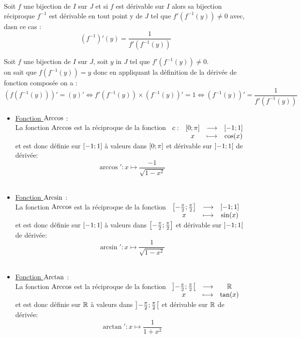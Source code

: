 \begin{defprop}
	Soit \(f\) une bijection de \(I\) sur \(J\)  et si \(f\) est dérivable sur \(I\) alors sa bijection réciproque \(f^{-1}\) est dérivable en tout point y de \(J\) tel que \(f'(f^{-1}(y)) \neq 0\) avec, dasn ce cas : \[(f^{-1})'(y) = \frac{1}{f'(f^{-1}(y))}\]
\end{defprop}
\begin{dem}
	Soit \(f\) une bijection de \(I\) sur \(J\), soit \(y\) in \(J\) tel que \(f'(f^{-1}(y)) \neq 0\). \\
	on sait que \(f(f^{-1}(y)) = y\) donc en appliquant la définition de la dérivée de fonction composée on a :
	\[(f(f^{-1}(y)))' = (y)' \iff f'(f^{-1}(y))\times (f^{-1}(y))' = 1 \iff (f^{-1}(y))' = \frac{1}{f'(f^{-1}(y))}\]
\end{dem}
\begin{defprop}
	\begin{itemize}
		\item \underline{Fonction \(\operatorname{Arccos}\)} : \\
		      La fonction \(\operatorname{Arccos}\) est la réciproque de la fonction \(\begin{array}[t]{cccc}c : & \left[0;\pi\right] & \longrightarrow & \left[-1;1\right] \\ & x & \longmapsto & \cos(x)\end{array}\) et est donc définie sur \(\left[-1;1\right]\) à valeurs dans \(\left[0;\pi\right]\) et dérivable sur \(\left]-1;1\right[\) de dérivée: \[\arccos':x\mapsto \frac{-1}{\sqrt{1-x^2}}\]\\
		\item \underline{Fonction \(\operatorname{Arcsin}\)} : \\
		      La fonction \(\operatorname{Arccos}\) est la réciproque de la fonction \(\begin{array}[t]{ccc}\left[-\frac{\pi}{2};\frac{\pi}{2}\right] & \longrightarrow & \left[-1;1\right] \\ x & \longmapsto & \sin(x)\end{array}\) et est donc définie sur \(\left[-1;1\right]\) à valeurs dans \(\left[-\frac{\pi}{2};\frac{\pi}{2}\right]\) et dérivable sur \(\left]-1;1\right[\) de dérivée: \[\arcsin':x\mapsto \frac{1}{\sqrt{1-x^2}}\]\\
		\item \underline{Fonction \(\operatorname{Arctan}\)} : \\
		      La fonction \(\operatorname{Arccos}\) est la réciproque de la fonction \(\begin{array}[t]{ccc}\left]-\frac{\pi}{2};\frac{\pi}{2}\right[ & \longrightarrow & \mathbb{R} \\ x & \longmapsto & \tan(x)\end{array}\) et est donc définie sur \(\mathbb{R}\) à valeurs dans \(\left]-\frac{\pi}{2};\frac{\pi}{2}\right[\) et dérivable sur \(\mathbb{R}\) de dérivée: \[\arctan':x\mapsto \frac{1}{1+x^2}\]\\
	\end{itemize}
\end{defprop}


